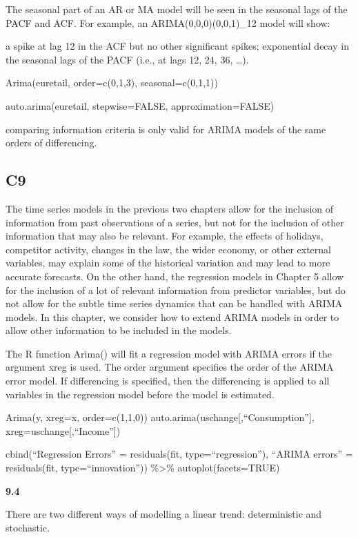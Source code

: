 \documentclass[]{book}
\begin{document}
The seasonal part of an AR or MA model will be seen in the seasonal lags
of the PACF and ACF. For example, an ARIMA(0,0,0)(0,0,1)\_12 model will
show:

a spike at lag 12 in the ACF but no other significant spikes;
exponential decay in the seasonal lags of the PACF (i.e., at lags 12,
24, 36, \ldots{}).

Arima(euretail, order=c(0,1,3), seasonal=c(0,1,1))

auto.arima(euretail, stepwise=FALSE, approximation=FALSE)

comparing information criteria is only valid for ARIMA models of the
same orders of differencing.

\subsection{C9}\label{c9}

The time series models in the previous two chapters allow for the
inclusion of information from past observations of a series, but not for
the inclusion of other information that may also be relevant. For
example, the effects of holidays, competitor activity, changes in the
law, the wider economy, or other external variables, may explain some of
the historical variation and may lead to more accurate forecasts. On the
other hand, the regression models in Chapter 5 allow for the inclusion
of a lot of relevant information from predictor variables, but do not
allow for the subtle time series dynamics that can be handled with ARIMA
models. In this chapter, we consider how to extend ARIMA models in order
to allow other information to be included in the models.

The R function Arima() will fit a regression model with ARIMA errors if
the argument xreg is used. The order argument specifies the order of the
ARIMA error model. If differencing is specified, then the differencing
is applied to all variables in the regression model before the model is
estimated.

Arima(y, xreg=x, order=c(1,1,0))
auto.arima(uschange{[},``Consumption''{]},
xreg=uschange{[},``Income''{]})

cbind(``Regression Errors'' = residuals(fit, type=``regression''),
``ARIMA errors'' = residuals(fit, type=``innovation''))
\%\textgreater{}\% autoplot(facets=TRUE)

\textbf{9.4}

There are two different ways of modelling a linear trend: deterministic
and stochastic.
\end{document}

